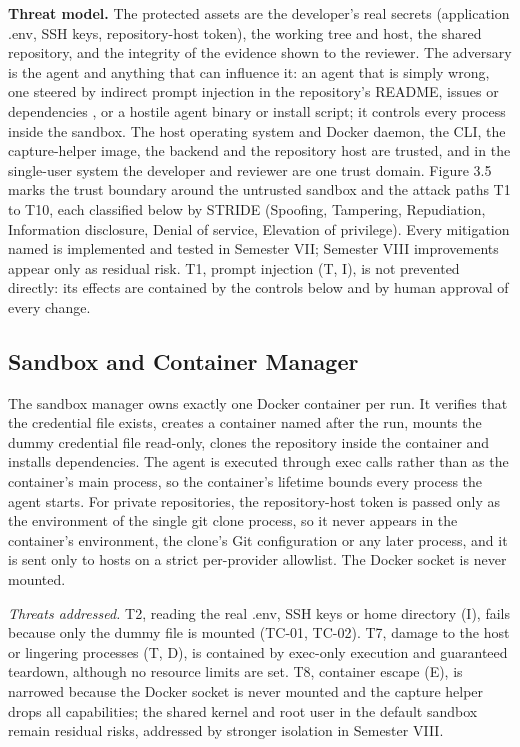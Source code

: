 \documentclass[12pt,a4paper,oneside]{report}
\begin{document}
\textbf{Threat model.}\label{threat-model} The protected assets are the developer's real secrets (application .env, SSH keys, repository-host token), the working tree and host, the shared repository, and the integrity of the evidence shown to the reviewer. The adversary is the agent and anything that can influence it: an agent that is simply wrong, one steered by indirect prompt injection in the repository's README, issues or dependencies \cite{ref7}, or a hostile agent binary or install script; it controls every process inside the sandbox. The host operating system and Docker daemon, the CLI, the capture-helper image, the backend and the repository host are trusted, and in the single-user system the developer and reviewer are one trust domain. Figure 3.5 marks the trust boundary around the untrusted sandbox and the attack paths T1 to T10, each classified below by STRIDE (Spoofing, Tampering, Repudiation, Information disclosure, Denial of service, Elevation of privilege). Every mitigation named is implemented and tested in Semester VII; Semester VIII improvements appear only as residual risk. T1, prompt injection (T, I), is not prevented directly: its effects are contained by the controls below and by human approval of every change.

\subsection{Sandbox and Container Manager}\label{sandbox-and-container-manager}

The sandbox manager owns exactly one Docker container per run. It verifies that the credential file exists, creates a container named after the run, mounts the dummy credential file read-only, clones the repository inside the container and installs dependencies. The agent is executed through exec calls rather than as the container's main process, so the container's lifetime bounds every process the agent starts. For private repositories, the repository-host token is passed only as the environment of the single git clone process, so it never appears in the container's environment, the clone's Git configuration or any later process, and it is sent only to hosts on a strict per-provider allowlist. The Docker socket is never mounted.

\textit{Threats addressed.} T2, reading the real .env, SSH keys or home directory (I), fails because only the dummy file is mounted (TC-01, TC-02). T7, damage to the host or lingering processes (T, D), is contained by exec-only execution and guaranteed teardown, although no resource limits are set. T8, container escape (E), is narrowed because the Docker socket is never mounted and the capture helper drops all capabilities; the shared kernel and root user in the default sandbox remain residual risks, addressed by stronger isolation in Semester VIII.
\end{document}
